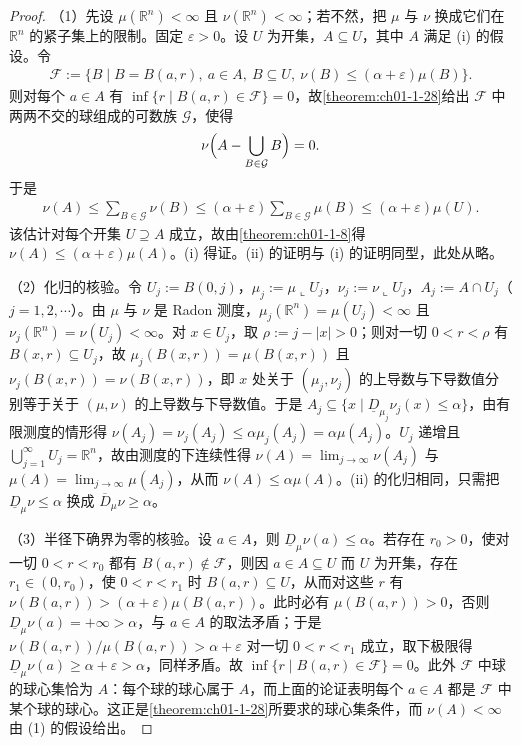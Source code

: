 \documentclass[../../main.tex]{subfiles}%
\begin{document}
\begin{proof}
（1）先设 $\mu(\mathbb{R}^n)<\infty$ 且 $\nu(\mathbb{R}^n)<\infty$；若不然，把 $\mu$ 与 $\nu$ 换成它们在 $\mathbb{R}^n$ 的紧子集上的限制。固定 $\varepsilon>0$。设 $U$ 为开集，$A\subseteq U$，其中 $A$ 满足 (i) 的假设。令
\begin{align*}
\mathcal{F}:=\{B\mid B=B(a,r),\ a\in A,\ B\subseteq U,\ \nu(B)\leqslant(\alpha+\varepsilon)\mu(B)\}.
\end{align*}
则对每个 $a\in A$ 有 $\inf\{r\mid B(a,r)\in\mathcal{F}\}=0$，故\cref{theorem:ch01-1-28}给出 $\mathcal{F}$ 中两两不交的球组成的可数族 $\mathcal{G}$，使得%
\begin{align*}
\nu\Bigl(A-\bigcup_{B\in\mathcal{G}}B\Bigr)=0.
\end{align*}
于是
\begin{align*}
\nu(A)\leqslant\sum_{B\in\mathcal{G}}\nu(B)\leqslant(\alpha+\varepsilon)\sum_{B\in\mathcal{G}}\mu(B)\leqslant(\alpha+\varepsilon)\mu(U).
\end{align*}
该估计对每个开集 $U\supseteq A$ 成立，故由\cref{theorem:ch01-1-8}得 $\nu(A)\leqslant(\alpha+\varepsilon)\mu(A)$。(i) 得证。(ii) 的证明与 (i) 的证明同型，此处从略。%

（2）化归的核验。令 $U_j:=B(0,j)$，$\mu_j:=\mu\llcorner U_j$，$\nu_j:=\nu\llcorner U_j$，$A_j:=A\cap U_j$（$j=1,2,\cdots$）。由 $\mu$ 与 $\nu$ 是 Radon 测度，$\mu_j(\mathbb{R}^n)=\mu(U_j)<\infty$ 且 $\nu_j(\mathbb{R}^n)=\nu(U_j)<\infty$。对 $x\in U_j$，取 $\rho:=j-\lvert x\rvert>0$；则对一切 $0<r<\rho$ 有 $B(x,r)\subseteq U_j$，故 $\mu_j(B(x,r))=\mu(B(x,r))$ 且 $\nu_j(B(x,r))=\nu(B(x,r))$，即 $x$ 处关于 $(\mu_j,\nu_j)$ 的上导数与下导数值分别等于关于 $(\mu,\nu)$ 的上导数与下导数值。于是 $A_j\subseteq\{x\mid\underline{D}_{\mu_j}\nu_j(x)\leqslant\alpha\}$，由有限测度的情形得 $\nu(A_j)=\nu_j(A_j)\leqslant\alpha\mu_j(A_j)=\alpha\mu(A_j)$。$U_j$ 递增且 $\bigcup_{j=1}^{\infty}U_j=\mathbb{R}^n$，故由测度的下连续性得 $\nu(A)=\lim_{j\to\infty}\nu(A_j)$ 与 $\mu(A)=\lim_{j\to\infty}\mu(A_j)$，从而 $\nu(A)\leqslant\alpha\mu(A)$。(ii) 的化归相同，只需把 $\underline{D}_{\mu}\nu\leqslant\alpha$ 换成 $\overline{D}_{\mu}\nu\geqslant\alpha$。

（3）半径下确界为零的核验。设 $a\in A$，则 $\underline{D}_{\mu}\nu(a)\leqslant\alpha$。若存在 $r_0>0$，使对一切 $0<r<r_0$ 都有 $B(a,r)\notin\mathcal{F}$，则因 $a\in A\subseteq U$ 而 $U$ 为开集，存在 $r_1\in(0,r_0)$，使 $0<r<r_1$ 时 $B(a,r)\subseteq U$，从而对这些 $r$ 有 $\nu(B(a,r))>(\alpha+\varepsilon)\mu(B(a,r))$。此时必有 $\mu(B(a,r))>0$，否则 $\underline{D}_{\mu}\nu(a)=+\infty>\alpha$，与 $a\in A$ 的取法矛盾；于是 $\nu(B(a,r))/\mu(B(a,r))>\alpha+\varepsilon$ 对一切 $0<r<r_1$ 成立，取下极限得 $\underline{D}_{\mu}\nu(a)\geqslant\alpha+\varepsilon>\alpha$，同样矛盾。故 $\inf\{r\mid B(a,r)\in\mathcal{F}\}=0$。此外 $\mathcal{F}$ 中球的球心集恰为 $A$：每个球的球心属于 $A$，而上面的论证表明每个 $a\in A$ 都是 $\mathcal{F}$ 中某个球的球心。这正是\cref{theorem:ch01-1-28}所要求的球心集条件，而 $\nu(A)<\infty$ 由 (1) 的假设给出。%


\end{proof}
\end{document}
